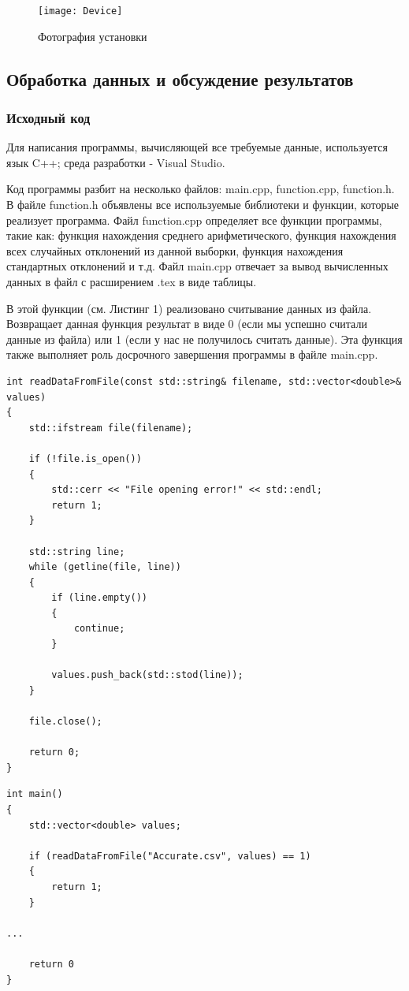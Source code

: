 \begin{figure}[ht!]
\centering
\texttt{[image: Device]}
\caption{Фотография установки}
\label{fig:device}
\end{figure}

\subsection{Обработка данных и обсуждение результатов}

\subsubsection{Исходный код}
Для написания программы, вычисляющей все требуемые данные, используется язык C++; среда разработки - Visual Studio.

Код программы разбит на несколько файлов: main.cpp, function.cpp, function.h. В файле function.h объявлены все используемые библиотеки и функции, которые реализует программа. Файл function.cpp определяет все функции программы, такие как: 
функция нахождения среднего арифметического, функция нахождения всех случайных отклонений из данной выборки, функция нахождения стандартных отклонений и т.д. Файл main.cpp отвечает за вывод вычисленных данных в файл с расширением .tex  в виде таблицы.

В этой функции (см. Листинг 1) реализовано считывание данных из файла. Возвращает данная функция результат в виде 0 (если мы успешно считали данные из файла) или 1 (если у нас не получилось считать данные). Эта функция также выполняет роль досрочного завершения программы в файле main.cpp.

\begin{lstlisting}[label=listing1, caption=Функция считывания данных из файла]
int readDataFromFile(const std::string& filename, std::vector<double>& values)
{
	std::ifstream file(filename);

	if (!file.is_open())
	{
		std::cerr << "File opening error!" << std::endl;
		return 1;
	}

	std::string line;
	while (getline(file, line))
	{
		if (line.empty())
		{
			continue;
		}

		values.push_back(std::stod(line));
	}

	file.close();

	return 0;
}

\end{lstlisting}

\begin{lstlisting}[label=listing2, caption=Реализация функции readDataFromFile()]
int main()
{
	std::vector<double> values;

	if (readDataFromFile("Accurate.csv", values) == 1)
	{
		return 1;
	}
    
...

    return 0
}
\end{lstlisting}

